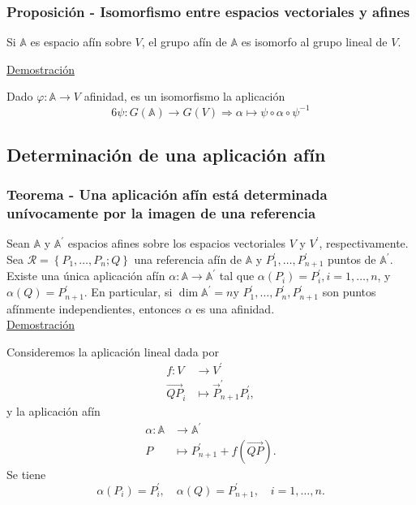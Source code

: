 \documentclass[12pt, a4paper, ones, notitlepage, openany,titlepage]{article}
\newcommand{\demostracion}{\noindent\underline{Demostración}}
\begin{document}
\subsubsection{Proposición - Isomorfismo entre espacios vectoriales y afines}
\noindent Si $\mathbb{A}$ es espacio afín sobre $V$, el grupo afín de $\mathbb{A}$ es isomorfo al grupo lineal de $V$.

\demostracion

\noindent Dado $\varphi : \mathbb{A} \longrightarrow V$ afinidad, es un isomorfismo la aplicación
$$6
\psi : G(\mathbb{A}) \longrightarrow G(V) \Longrightarrow \alpha \longmapsto \psi \circ \alpha \circ \psi^{-1}
$$

\subsection{Determinación de una aplicación afín}

\subsubsection{Teorema - Una aplicación afín está determinada unívocamente por la imagen de una referencia} Sean $\mathbb{A}$ y $\mathbb{A}^{\prime}$ espacios afines sobre los espacios vectoriales $V$ y $V^{\prime}$, respectivamente. Sea $\mathcal{R}=\left\{P_{1}, \ldots, P_{n} ; Q\right\}$ una referencia afín de $\mathbb{A}$ y $P_{1}^{\prime}, \ldots, P_{n+1}^{\prime}$ puntos de $\mathbb{A}^{\prime}$. Existe una única aplicación afín $\alpha: \mathbb{A} \rightarrow \mathbb{A}^{\prime}$ tal que $\alpha\left(P_{i}\right)=P_{i}^{\prime}, i=1, \ldots, n$, y $\alpha(Q)=P_{n+1}^{\prime}$. En particular, si $\dim  \mathbb{A}^{\prime}=n \mathrm{y}$ $P_{1}^{\prime}, \ldots, P_{n}^{\prime}, P_{n+1}^{\prime}$ son puntos afínmente independientes, entonces $\alpha$ es una afinidad.\\

\demostracion

\noindent Consideremos la aplicación lineal dada por
$$
\begin{aligned}
f: V & \longrightarrow V^{\prime} \\
\overrightarrow{Q P}_{i} & \longmapsto \vec{P}_{n+1}^{\prime} P_{i}^{\prime},
\end{aligned}
$$
\noindent y la aplicación afín
$$
\begin{aligned}
\alpha: \mathbb{A} & \longrightarrow \mathbb{A}^{\prime} \\
P & \longmapsto P_{n+1}^{\prime}+f(\overrightarrow{Q P}) .
\end{aligned}
$$
\noindent Se tiene
$$
\alpha\left(P_{i}\right)=P_{i}^{\prime}, \quad \alpha(Q)=P_{n+1}^{\prime}, \quad i=1, \ldots, n .
$$
\end{document}
